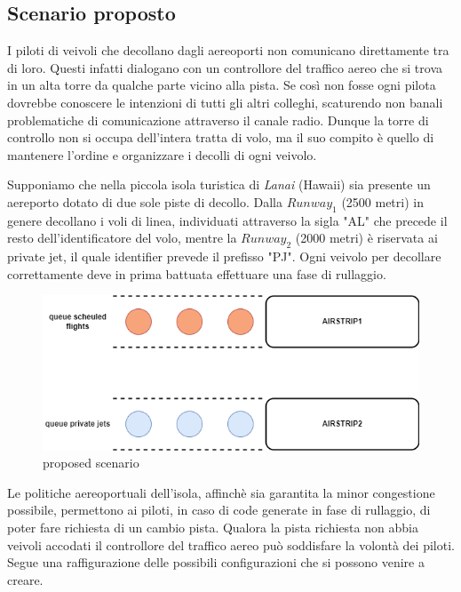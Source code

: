 \documentclass{article}
\begin{document}
\begin{sloppy}
\section{Scenario proposto}
I piloti di veivoli che decollano dagli aereoporti non comunicano direttamente tra di loro. Questi infatti dialogano con un controllore del traffico aereo che si trova in un alta torre da qualche parte vicino alla pista. Se così non fosse ogni pilota dovrebbe conoscere le intenzioni di tutti gli altri colleghi, scaturendo non banali problematiche di comunicazione attraverso il canale radio. Dunque la torre di controllo non si occupa dell'intera tratta di volo, ma il suo compito è quello di mantenere l'ordine e organizzare i decolli di ogni veivolo.

\bigbreak

Supponiamo che nella piccola isola turistica di \textit{Lanai} (Hawaii) sia presente un aereporto dotato di due sole piste di decollo. Dalla \textit{$Runway_1$} (2500 metri) in genere decollano i voli di linea, individuati attraverso la sigla "AL" che precede il resto dell'identificatore del volo, mentre la \textit{$Runway_2$} (2000 metri) è riservata ai private jet, il quale identifier prevede il prefisso "PJ". Ogni veivolo per decollare correttamente deve in prima battuata effettuare una fase di rullaggio.

\bigbreak

\begin{figure}
    \centering
    \includegraphics[scale=0.5]{figure1.png}
    \caption{proposed scenario}
    \label{fig:enter-label}
\end{figure}

\bigbreak
Le politiche aereoportuali dell'isola, affinchè sia garantita la minor congestione possibile, permettono ai piloti, in caso di code generate in fase di rullaggio, di poter fare richiesta di un cambio pista. Qualora la pista richiesta non abbia veivoli accodati il controllore del traffico aereo può soddisfare la volontà dei piloti. Segue una raffigurazione delle possibili configurazioni che si possono venire a creare.


\end{sloppy}
\end{document}
